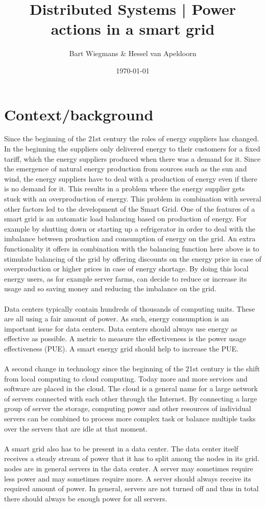 \documentclass[10pt]{article} %
\title{\textsf{Distributed Systems | Power actions in a smart grid}}
\author{Bart Wiegmans \& Hessel van Apeldoorn}
\date{\today}
\begin{document}
\maketitle
\newpage
\section{Context/background}
Since the beginning of the 21st century the roles of energy suppliers has changed.  In the beginning the suppliers only delivered energy to their customers for a fixed tariff, which the energy suppliers produced when there was a demand for it. Since the emergence of natural energy production from sources such as the sun and wind, the energy suppliers have to deal with a production of energy even if there is no demand for it.  This results in a problem where the energy supplier gets stuck with an overproduction of energy.  This problem in combination with several other factors led to the development of the Smart Grid.
One of the features of a smart grid is an automatic load balancing based on production of energy. For example by shutting down or starting up a refrigerator in order to deal with the imbalance between production and consumption of energy on the grid.
An extra functionality it offers in combination with the balancing function here above is to stimulate balancing of the grid by offering discounts on the energy price in case of overproduction or higher prices in case of energy shortage. By doing this local energy users, as for example server farms, can decide to reduce or increase its usage and so saving money and reducing the imbalance on the grid.\\
 \\
Data centers typically contain hundreds of thousands of computing units. These are all using a fair amount of power. As such, energy consumption is an important issue for data centers. Data centers should always use energy as effective as possible. A metric to measure the effectiveness is the power usage effectiveness (PUE). A smart energy grid should help to increase the PUE.\\
\\
A second change in technology since the beginning of the 21st century is the shift from local computing to cloud computing.  Today more and more services and software are placed in the cloud. The cloud is a general name for a large network of servers connected with each other through the Internet. By connecting a large group of server the storage, computing power and other resources of individual servers can be combined to process more complex task or balance multiple tasks over the servers that are idle at that moment.\\
\\
A smart grid also has to be present in a data center. The data center itself receives a steady stream of power that it has to split among the nodes in its grid. nodes are in general servers in the data center. A server may sometimes require less power and may sometimes require more. A server should always receive its required amount of power. In general, servers are not turned off and thus in total there should always be enough power for all servers.
\end{document}
